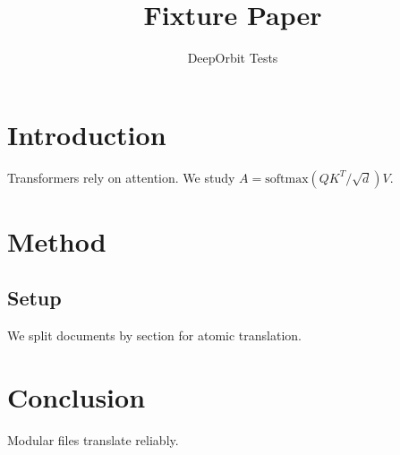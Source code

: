 \documentclass{article}
\title{Fixture Paper}
\author{DeepOrbit Tests}
\begin{document}
\maketitle

\section{Introduction}
Transformers rely on attention. We study $A = \mathrm{softmax}(QK^T/\sqrt{d})V$.

\section{Method}
\subsection{Setup}
We split documents by section for atomic translation.

\section{Conclusion}
Modular files translate reliably.
\end{document}
